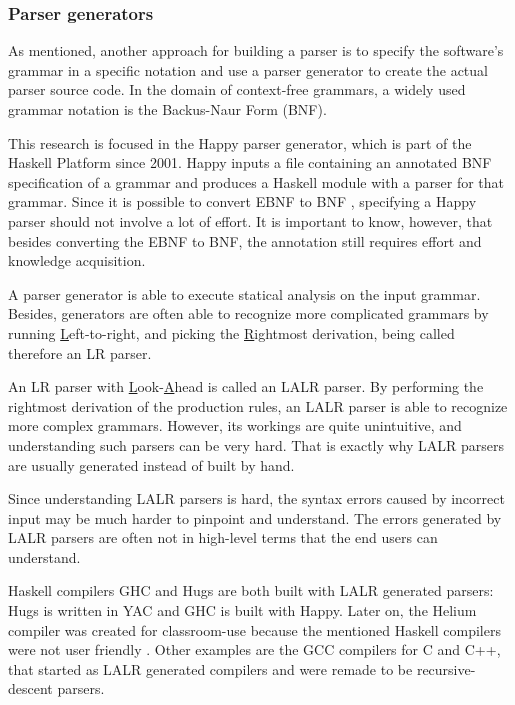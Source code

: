\subsubsection{Parser generators}
As mentioned, another approach for building a parser is to specify the software's grammar in a specific notation and use a parser generator to create the actual parser source code.
In the domain of context-free grammars, a widely used grammar notation is the Backus-Naur Form (BNF).

%
This research is focused in the Happy parser generator, which is part of the Haskell Platform since 2001.
Happy inputs a file containing an annotated BNF specification of a grammar and produces a Haskell module with a parser for that grammar.
Since it is possible to convert EBNF to BNF , specifying a Happy parser should not involve a lot of effort.
It is important to know, however, that besides converting the EBNF to BNF, the annotation still requires effort and knowledge acquisition.

%
A parser generator is able to execute statical analysis on the input grammar.
Besides, generators are often able to recognize more complicated grammars by running \underline{L}eft-to-right, and picking the \underline{R}ightmost derivation, being called therefore an LR parser.

%
An LR parser with \underline{L}ook-\underline{A}head is called an LALR parser.
By performing the rightmost derivation of the production rules, an LALR parser is able to recognize more complex grammars.
However, its workings are quite unintuitive, and understanding such parsers can be very hard.
That is exactly why LALR parsers are usually generated instead of built by hand.

Since understanding LALR parsers is hard, the syntax errors caused by incorrect input may be much harder to pinpoint and understand.
The errors generated by LALR parsers are often not in high-level terms that the end users can understand.

%
%
%
%
%
Haskell compilers GHC and Hugs are both built with LALR generated parsers: Hugs is written in YAC and GHC is built with Happy.
Later on, the Helium compiler was created for classroom-use because the mentioned Haskell compilers were not user friendly .
Other examples are the GCC compilers for C and C++, that started as LALR generated compilers and were remade to be recursive-descent parsers.


